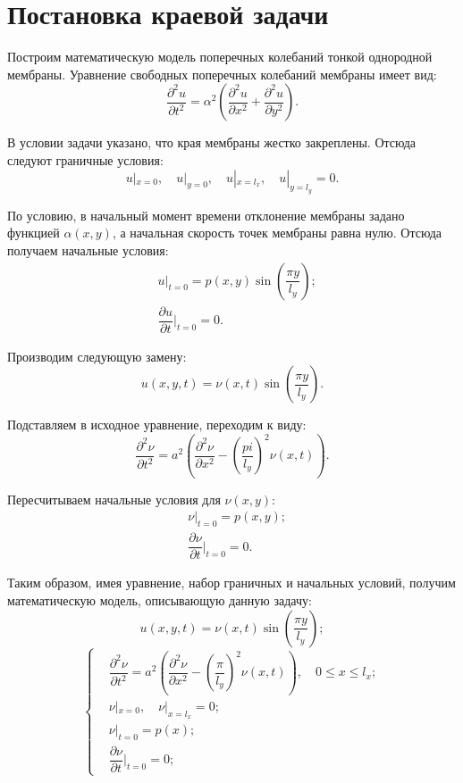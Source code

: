 \section{Постановка краевой задачи}
{
	Построим математическую модель поперечных колебаний тонкой однородной мембраны.
	Уравнение свободных поперечных колебаний мембраны имеет вид:
	\begin{equation}\label{source_func}
	\dfrac{\partial^2 u}{\partial t^2} = \alpha^2(
	\dfrac{\partial^2 u}{\partial x^2} + 
	\dfrac{\partial^2 u}{\partial y^2}).
	\end{equation}
	
	В условии задачи указано, что края мембраны жестко закреплены. Отсюда
	следуют граничные условия:
	\begin{equation}
	u|_{x=0}, \quad
	u|_{y=0},  \quad
	u|_{x=l_x}, \quad
	u|_{y=l_y} = 0.
	\end{equation}
	
	По условию, в начальный момент времени отклонение мембраны задано функцией $\alpha(x, y)$, а начальная скорость точек мембраны равна нулю. Отсюда получаем начальные условия:
	\begin{align*}
	&  u|_{t=0} = p(x,y)\sin(\dfrac{\pi y}{l_y});\\        
	& \dfrac{\partial u}{\partial t}|_{t=0} = 0.
	\end{align*}
	
	Производим следующую замену:
	\begin{equation}\label{change}
	u(x,y,t) = \nu(x,t)\sin (\dfrac{\pi y}{l_y}).
	\end{equation}    
	
	Подставляем в исходное уравнение, переходим к виду:
	\begin{equation}
	\dfrac{\partial^2 \nu}{\partial t^2} = a^2\left(\dfrac{\partial^2 \nu}{\partial x^2}
	- \left(\dfrac{pi}{l_y}\right)^2\nu(x, t)\right).
	\end{equation}
	
	Пересчитываем начальные условия для $\nu(x,y)$:
	\begin{align*}
	&  \nu|_{t=0} = p(x,y);\\        
	& \dfrac{\partial \nu}{\partial t}|_{t=0} = 0.
	\end{align*}
	
	
	Таким образом, имея уравнение, набор граничных и начальных условий, получим математическую модель, описывающую данную задачу:
	\begin{equation}
	u(x,y,t) = \nu(x,t)\sin (\dfrac{\pi y}{l_y});
	\end{equation}
	\begin{equation}\label{full_initial_problem}
	\left\{
	\begin{split}
	& \dfrac{\partial^2 \nu}{\partial t^2} = a^2\left(\dfrac{\partial^2 \nu}{\partial x^2}
	- \left(\dfrac{\pi}{l_y}\right)^2\nu(x, t)\right), {\quad 0 \le x \le l_x;} \\
	&\nu|_{x=0}, \quad  
	\nu|_{x=l_x} = 0;\\
	&  \nu|_{t=0} = p(x);\\        
	& \dfrac{\partial \nu}{\partial t}|_{t=0} = 0;
	\end{split}
	\right.
	\end{equation}
}


